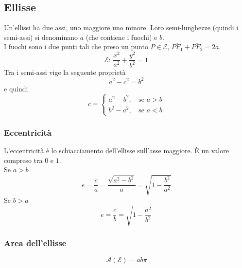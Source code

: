 \subsection{Ellisse}\label{subsec:geomanal:ellisse}
\begin{center}
\end{center}
Un'ellissi ha due assi, uno maggiore uno minore. Loro semi-lunghezze (quindi i semi-assi) si 
denominano $a$ (che contiene i fuochi) e $b$.\\
I fuochi sono i due punti tali che preso un punto $P\in\mathscr{E}$, 
$\overline{PF_1}+\overline{PF_2} = 2a$.
\begin{equation*}
\mathscr{E}:\,\frac{x^2}{a^2}+\frac{y^2}{b^2}=1
\end{equation*}
Tra i semi-assi vige la seguente proprietà
\begin{equation*}
a^2-c^2=b^2
\end{equation*}
e quindi
\begin{equation*}
c = \begin{cases}
a^2-b^2,\, &\text{se } a > b\\
b^2-a^2,\, &\text{se } a < b
\end{cases}
\end{equation*}

\subsubsection{Eccentricità}
L'eccentricità è lo schiacciamento dell'ellisse sull'asse maggiore. È un valore compreso tra $0$ e 
$1$.\\
Se $a>b$
\begin{equation*}
e = \frac{c}{a} = \frac{\sqrt{a^2-b^2}}{a}=\sqrt{1-\frac{b^2}{a^2}}
\end{equation*}
Se $b>a$
\begin{equation*}
e = \frac{c}{b} = \sqrt{1-\frac{a^2}{b^2}}
\end{equation*}

\subsubsection{Area dell'ellisse}
\begin{equation*}
\mathscr{A}(\mathscr{E}) = ab\pi
\end{equation*}

